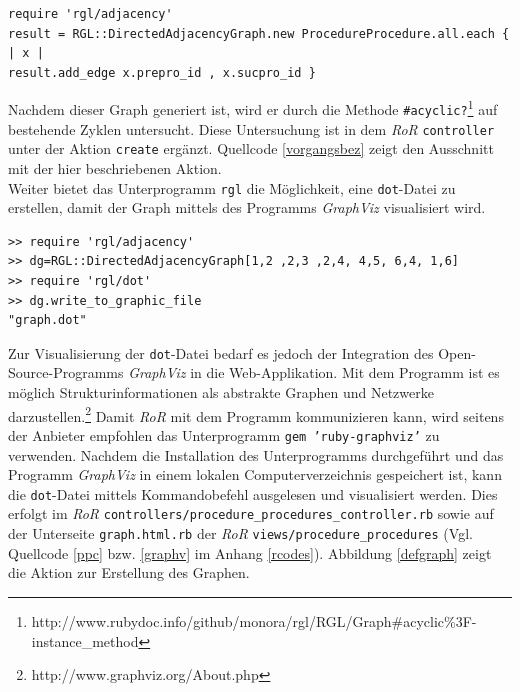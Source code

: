 \documentclass[a4paper,12pt,parskip,bibtotoc,liststotoc]{article}
\begin{document}
\begin{lstlisting}[caption=Erstellung eines Graphen mittels des Unterprogramms \glqq rgl\grqq, style=Listing, label=rgl-seite]
require 'rgl/adjacency'
result = RGL::DirectedAdjacencyGraph.new ProcedureProcedure.all.each { | x |
result.add_edge x.prepro_id , x.sucpro_id }
\end{lstlisting}
\vspace{0.5cm} 

Nachdem dieser Graph generiert ist, wird er durch die Methode \texttt{\#acyclic?}\footnote{http://www.rubydoc.info/github/monora/rgl/RGL/Graph\#acyclic\%3F-instance\_method} auf bestehende Zyklen untersucht. Diese Untersuchung ist in dem \textit{RoR} \texttt{controller} unter der Aktion \texttt{create} ergänzt. Quellcode \ref{vorgangsbez} zeigt den Ausschnitt mit der hier beschriebenen Aktion.\\

Weiter bietet das Unterprogramm \texttt{rgl} die Möglichkeit, eine \texttt{dot}-Datei zu erstellen, damit der Graph mittels des Programms \textit{GraphViz} visualisiert wird.
\newpage


\begin{lstlisting}[caption=Prüfung auf Zyklen mittels des Unterprogramms \glqq rgl\grqq, style=Listing, label=rgl-vonseite]
>> require 'rgl/adjacency'
>> dg=RGL::DirectedAdjacencyGraph[1,2 ,2,3 ,2,4, 4,5, 6,4, 1,6]
>> require 'rgl/dot'
>> dg.write_to_graphic_file
"graph.dot"
\end{lstlisting}

Zur Visualisierung der \texttt{dot}-Datei bedarf es jedoch der Integration des Open-Source-Pro\-gramms \textit{GraphViz} in die Web-Applikation. Mit dem Programm ist es möglich Strukturinformationen als abstrakte Graphen und Netzwerke darzustellen.\footnote{http://www.graphviz.org/About.php} Damit \textit{RoR} mit dem Programm kommunizieren kann, wird seitens der Anbieter empfohlen das Unterprogramm \texttt{gem 'ruby-graphviz'} zu verwenden. Nachdem die Installation des Unterprogramms durchgeführt und das Programm \textit{GraphViz} in einem lokalen Computerverzeichnis gespeichert ist, kann die \texttt{dot}-Datei mittels Kommandobefehl ausgelesen und visualisiert werden. Dies erfolgt im \textit{RoR} \texttt{controllers/procedure\_procedures\_controller.rb} sowie auf der Unterseite \texttt{graph.html.rb} der \textit{RoR} \texttt{views/procedure\_procedures} (Vgl. Quellcode \ref{ppc} bzw. \ref{graphv} im Anhang \ref{rcodes}). Abbildung \ref{defgraph} zeigt die Aktion zur Erstellung des Graphen.
\end{document}
